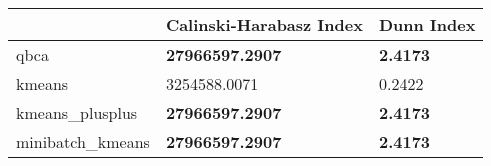 \begin{table}[htbp]
\centering
\begin{tabular}{lll}
\toprule
 & Calinski-Harabasz Index & Dunn Index \\
\midrule
qbca & \textbf{27966597.2907} & \textbf{2.4173} \\
kmeans & 3254588.0071 & 0.2422 \\
kmeans_plusplus & \textbf{27966597.2907} & \textbf{2.4173} \\
minibatch_kmeans & \textbf{27966597.2907} & \textbf{2.4173} \\
\bottomrule
\end{tabular}
\end{table}
